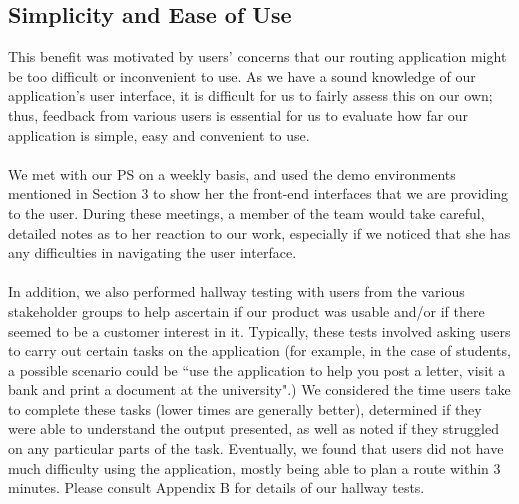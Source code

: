 \documentclass[a4paper, 10pt]{report}
\begin{document}
\subsection{Simplicity and Ease of Use}
This benefit was motivated by users' concerns that our routing application might be too difficult or inconvenient to use. As we have a sound knowledge of our application's user interface, it is difficult for us to fairly assess this on our own; thus, feedback from various users is essential for us to evaluate how far our application is simple, easy and convenient to use. \\\\
We met with our PS on a weekly basis, and used the demo environments mentioned in Section 3 to show her the front-end interfaces that we are providing to the user. During these meetings, a member of the team would take careful, detailed notes as to her reaction to our work, especially if we noticed that she has any difficulties in navigating the user interface. \\\\
In addition, we also performed hallway testing with users from the various stakeholder groups to help ascertain if our product was usable and/or if there seemed to be a customer interest in it. Typically, these tests involved asking users to carry out certain tasks on the application (for example, in the case of students, a possible scenario could be ``use the application to help you post a letter, visit a bank and print a document at the university".) We considered the time users take to complete these tasks (lower times are generally better), determined if they were able to understand the output presented, as well as noted if they struggled on any particular parts of the task. Eventually, we found that users did not have much difficulty using the application, mostly being able to plan a route within 3 minutes. Please consult Appendix B for details of our hallway tests. 
\end{document}
